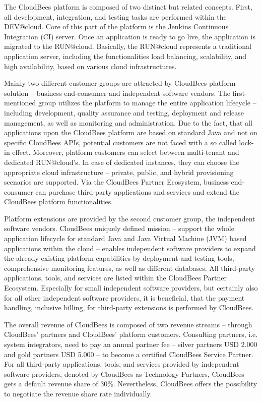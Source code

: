 The CloudBees platform is composed of two distinct but related concepts. First, all development, integration, and testing tasks are performed within the DEV@cloud. Core of this part of the platform is the Jenkins Continuous Integration (CI) server. Once an application is ready to go live, the application is migrated to the RUN@cloud. Basically, the RUN@cloud represents a traditional application server, including the functionalities load balancing, scalability, and high availability, based on various cloud infrastructures.

Mainly two different customer groups are attracted by CloudBees platform solution -- business end-consumer and independent software vendors. The first-mentioned group utilizes the platform to manage the entire application lifecycle -- including development, quality assurance and testing, deployment and release management, as well as monitoring and administration. Due to the fact, that all applications upon the CloudBees platform are based on standard Java and not on specific CloudBees APIs, potential customers are not faced with a so called lock-in effect. Moreover, platform customers can select between multi-tenant and dedicated RUN@cloud's. In case of dedicated instances, they can choose the appropriate cloud infrastructure -- private, public, and hybrid provisioning scenarios are supported. Via the CloudBees Partner Ecosystem, business end-consumer can purchase third-party applications and services and extend the CloudBees platform functionalities. 

Platform extensions are provided by the second customer group, the independent software vendors. CloudBees uniquely defined mission -- support the whole application lifecycle for standard Java and Java Virtual Machine (JVM) based applications within the cloud -- enables independent software providers to expand the already existing platform capabilities by deployment and testing tools, comprehensive monitoring features, as well as different databases. All third-party applications, tools, and services are listed within the CloudBees Partner Ecosystem. Especially for small independent software providers, but certainly also for all other independent software providers, it is beneficial, that the payment handling, inclusive billing, for third-party extensions is performed by CloudBees.

The overall revenue of CloudBees is composed of two revenue streams -- through CloudBees' partners and CloudBees' platform customers. Consulting partners, i.e. system integrators, need to pay an annual partner fee -- silver partners USD 2.000 and gold partners USD 5.000 -- to become a certified CloudBees Service Partner. For all third-party applications, tools, and services provided by independent software providers, denoted by CloudBees as Technology Partners, CloudBees gets a default revenue share of 30\%. Nevertheless, CloudBees offers the possibility to negotiate the revenue share rate individually.

